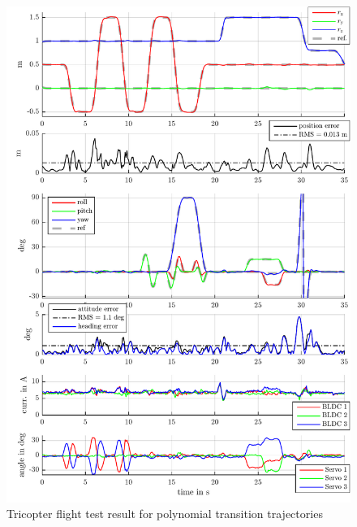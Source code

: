 \begin{figure}
 \centering
 \includegraphics{graphics/TriFlightTest/TriManeuver42Result}
 \caption{Tricopter flight test result for polynomial transition trajectories}
 \label{fig:TriManeuver42Result}
\end{figure}

